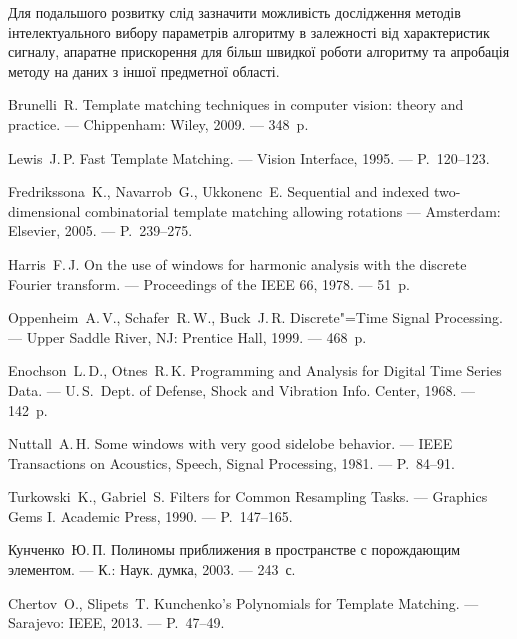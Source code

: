 \documentclass{thesis_utf8}
\begin{document}
Для подальшого розвитку слід зазначити можливість дослідження методів інтелектуального вибору параметрів алгоритму в
залежності від характеристик сигналу, апаратне прискорення для більш швидкої роботи алгоритму та апробація методу на
даних з іншої предметної області.

\begin{thebibliography}
    Brunelli~R. Template matching techniques in computer vision: theory and practice. --- Chippenham: Wiley, 2009. ---
    348~p.

    Lewis~J.\,P. Fast Template Matching. --- Vision Interface, 1995. --- P.~120--123.

    Fredrikssona~K., Navarrob~G., Ukkonenc~E. Sequential and indexed two-dimensional combinatorial template matching
    allowing rotations --- Amsterdam: Elsevier, 2005. --- P.~239--275.

    Harris~F.\,J. On the use of windows for harmonic analysis with the discrete Fourier transform. --- Proceedings of
    the IEEE 66, 1978. --- 51~p.

    Oppenheim~A.\,V., Schafer~R.\,W., Buck~J.\,R. Discrete"=Time Signal Processing. --- Upper Saddle River, NJ:
    Prentice Hall, 1999. --- 468~p.

    Enochson~L.\,D., Otnes~R.\,K. Programming and Analysis for Digital Time Series Data. --- U.\,S.~Dept. of Defense,
    Shock and Vibration Info. Center, 1968. --- 142~p.

    Nuttall~A.\,H. Some windows with very good sidelobe behavior. --- IEEE Transactions on Acoustics, Speech, Signal
    Processing, 1981. --- P.~84--91.

    Turkowski~K., Gabriel~S. Filters for Common Resampling Tasks. --- Graphics Gems I. Academic Press, 1990. ---
    P.~147--165.

    Кунченко~Ю.\,П. Полиномы приближения в пространстве с порождающим элементом. --- К.: Наук. думка, 2003. --- 243~с.

    Chertov~O., Slipets~T. Kunchenko's Polynomials for Template Matching. --- Sarajevo: IEEE, 2013. --- P.~47--49.


\end{thebibliography}
\end{document}

